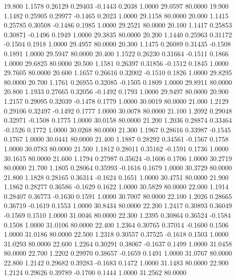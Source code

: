   19.800   1.1578   0.26129   0.29403  -0.1443   0.2038   1.0000  29.0597  80.0000
  19.900   1.1482   0.25905   0.29977  -0.1465   0.2023   1.0000  29.1158  80.0000
  20.000   1.1415   0.25785   0.30508  -0.1486   0.1985   1.0000  29.2521  80.0000
  20.100   1.1417   0.25853   0.30871  -0.1496   0.1949   1.0000  29.3835  80.0000
  20.200   1.1440   0.25963   0.31172  -0.1504   0.1918   1.0000  29.4957  80.0000
  20.300   1.1475   0.26089   0.31435  -0.1508   0.1891   1.0000  29.5947  80.0000
  20.400   1.1522   0.26230   0.31664  -0.1511   0.1866   1.0000  29.6825  80.0000
  20.500   1.1581   0.26397   0.31856  -0.1512   0.1845   1.0000  29.7605  80.0000
  20.600   1.1657   0.26616   0.32002  -0.1510   0.1826   1.0000  29.8295  80.0000
  20.700   1.1761   0.26955   0.32085  -0.1505   0.1809   1.0000  29.8911  80.0000
  20.800   1.1933   0.27665   0.32056  -0.1492   0.1793   1.0000  29.9497  80.0000
  20.900   1.2157   0.29095   0.32039  -0.1478   0.1779   1.0000  30.0019  80.0000
  21.000   1.2129   0.29106   0.32497  -0.1492   0.1777   1.0000  30.0078  80.0000
  21.100   1.2092   0.29048   0.32971  -0.1508   0.1775   1.0000  30.0158  80.0000
  21.200   1.2036   0.28874   0.33464  -0.1526   0.1772   1.0000  30.0268  80.0000
  21.300   1.1967   0.28616   0.33987  -0.1545   0.1767   1.0000  30.0441  80.0000
  21.400   1.1887   0.28292   0.34561  -0.1567   0.1758   1.0000  30.0783  80.0000
  21.500   1.1812   0.28011   0.35162  -0.1591   0.1736   1.0000  30.1615  80.0000
  21.600   1.1794   0.27987   0.35624  -0.1606   0.1706   1.0000  30.2719  80.0000
  21.700   1.1805   0.28064   0.35993  -0.1616   0.1679   1.0000  30.3729  80.0000
  21.800   1.1828   0.28165   0.36314  -0.1624   0.1651   1.0000  30.4751  80.0000
  21.900   1.1862   0.28277   0.36586  -0.1629   0.1622   1.0000  30.5829  80.0000
  22.000   1.1914   0.28407   0.36773  -0.1630   0.1591   1.0000  30.7007  80.0000
  22.100   1.2026   0.28665   0.36719  -0.1619   0.1553   1.0000  30.8434  80.0000
  22.200   1.2417   0.30893   0.36049  -0.1569   0.1510   1.0000  31.0046  80.0000
  22.300   1.2395   0.30864   0.36524  -0.1584   0.1508   1.0000  31.0106  80.0000
  22.400   1.2364   0.30765   0.37014  -0.1600   0.1506   1.0000  31.0186  80.0000
  22.500   1.2318   0.30557   0.37525  -0.1618   0.1503   1.0000  31.0293  80.0000
  22.600   1.2264   0.30291   0.38067  -0.1637   0.1499   1.0000  31.0458  80.0000
  22.700   1.2202   0.29970   0.38657  -0.1659   0.1491   1.0000  31.0767  80.0000
  22.800   1.2142   0.29682   0.39283  -0.1683   0.1472   1.0000  31.1483  80.0000
  22.900   1.2124   0.29626   0.39789  -0.1700   0.1444   1.0000  31.2562  80.0000
